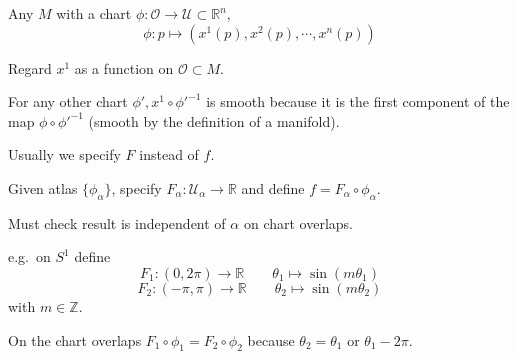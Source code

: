 \documentclass[a4paper,11pt]{article}
\DeclareMathOperator{\cpf}{\circ}
\begin{document}
	\begin{ex}
		Any $M$ with a chart $\phi: \mathcal{O} \to \mathcal{U} \subset \mathbb{R}^n$,
		$$\phi: p \mapsto (x^1(p),x^2(p), \cdots, x^n(p))$$

		Regard $x^1$ as a function on $\mathcal{O} \subset M$.

		For any other chart $\phi', x^1 \cpf \phi'^{-1}$ is smooth because it is the first component of the map $ \phi \cpf \phi'^{-1}$ (smooth by the definition of a manifold).
	\end{ex}

	\begin{ex}
		Usually we specify $F$ instead of $f$.

		Given atlas $\{\phi_\alpha\}$, specify $F_\alpha: \mathcal{U}_\alpha \to \mathbb{R}$ and define $f = F_\alpha \cpf \phi_\alpha$.

		Must check result is independent of $\alpha$ on chart overlaps.

		e.g.\ on $S^1$ define
		\[
			F_1 : (0,2\pi) \to \mathbb{R} \qquad \theta_1 \mapsto \sin(m \theta_1)
		\]
		\[
			F_2 : (-\pi,\pi) \to \mathbb{R} \qquad \theta_2 \mapsto \sin(m\theta_2)
		\]
		with $ m \in \mathbb{Z}$.

		On the chart overlaps $F_1 \cpf \phi_1 = F_2 \cpf \phi_2$ because $\theta_2 = \theta_1$ or $\theta_1 - 2\pi$.
	\end{ex}
\end{document}
